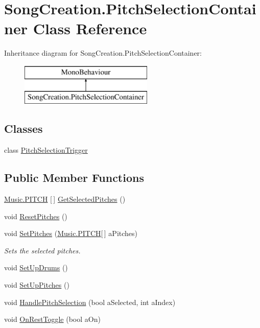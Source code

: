 \hypertarget{class_song_creation_1_1_pitch_selection_container}{}\section{Song\+Creation.\+Pitch\+Selection\+Container Class Reference}
\label{class_song_creation_1_1_pitch_selection_container}
Inheritance diagram for Song\+Creation.\+Pitch\+Selection\+Container\+:\begin{figure}[H]
\begin{center}
\leavevmode
\includegraphics[height=2.000000cm]{class_song_creation_1_1_pitch_selection_container}
\end{center}
\end{figure}
\subsection*{Classes}
\begin{DoxyCompactItemize}
\item 
class \hyperlink{group___s_c_handlers_class_song_creation_1_1_pitch_selection_container_1_1_pitch_selection_trigger}{Pitch\+Selection\+Trigger}
\end{DoxyCompactItemize}
\subsection*{Public Member Functions}
\begin{DoxyCompactItemize}
\item 
\hyperlink{group___music_enums_ga508f69b199ea518f935486c990edac1d}{Music.\+P\+I\+T\+CH} \mbox{[}$\,$\mbox{]} \hyperlink{group___s_c_handlers_gac7a3634aba275f03dffe9f45e444dbf1}{Get\+Selected\+Pitches} ()
\item 
void \hyperlink{group___s_c_handlers_ga9dc0b40102f1fb0e50fdf07ca7b31d96}{Reset\+Pitches} ()
\item 
void \hyperlink{group___s_c_handlers_ga906474015828cf26182e1f06f7094e00}{Set\+Pitches} (\hyperlink{group___music_enums_ga508f69b199ea518f935486c990edac1d}{Music.\+P\+I\+T\+CH}\mbox{[}$\,$\mbox{]} a\+Pitches)
\begin{DoxyCompactList}\small\item\em Sets the selected pitches. \end{DoxyCompactList}\item 
void \hyperlink{group___s_c_handlers_gae0bda65460aedf8384cd51bd6079d85b}{Set\+Up\+Drums} ()
\item 
void \hyperlink{group___s_c_handlers_ga77883e72bde65d22eaa2ace411fd9206}{Set\+Up\+Pitches} ()
\item 
void \hyperlink{group___s_c_handlers_gac87a7591bbd41276ff2ea28b7698b30c}{Handle\+Pitch\+Selection} (bool a\+Selected, int a\+Index)
\item 
void \hyperlink{group___s_c_handlers_ga6099b691cc9af45777cfc76f3f681efe}{On\+Rest\+Toggle} (bool a\+On)
\end{DoxyCompactItemize}
